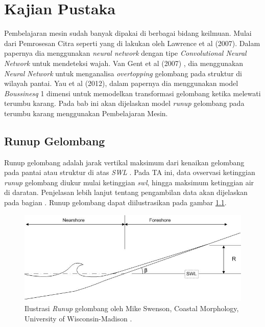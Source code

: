 \chapter{Kajian Pustaka}

    Pembelajaran mesin sudah banyak dipakai di berbagai bidang keilmuan. Mulai dari Pemrosesan Citra seperti yang di lakukan oleh Lawrence et al (2007)\cite{lawrence1997face}. Dalam papernya dia menggunakan \emph{neural network} dengan tipe \emph{Convolutional Neural Network} untuk mendeteksi wajah. Van Gent et al (2007) \cite{van2007neural}, dia menggunakan \emph{Neural Network} untuk menganalisa \emph{overtopping} gelombang pada struktur di wilayah pantai. Yau et al (2012)\cite{YAO201230}, dalam papernya dia menggunakan model \emph{Boussinesq} 1 dimensi untuk memodelkan transformasi gelombang ketika melewati terumbu karang. Pada bab ini akan dijelaskan model \emph{runup} gelombang pada terumbu karang menggunakan Pembelajaran Mesin.

\section{Runup Gelombang}

    Runup gelombang adalah jarak vertikal maksimum dari kenaikan gelombang pada pantai atau struktur di atas \emph{SWL} \cite{sorensen2005basic}. Pada TA ini, data ovservasi ketinggian \emph{runup} gelombang diukur mulai ketinggian \emph{swl}, hingga maksimum ketinggian air di daratan. Penjelasan lebih lanjut tentang pengambilan data akan dijelaskan pada bagian . Runup gelombang dapat diilustrasikan pada gambar \ref{fig:runup}.

    \begin{figure}
        \begin{center}
            \includegraphics[scale=0.7]{./images/runup_gelombang.jpg}
        \end{center}
        \caption{Ilustrasi \emph{Runup} gelombang oleh Mike Swenson, Coastal Morphology, University of Wisconsin-Madison \cite{MikeSwenson:WaveRunup}.}
        \label{fig:runup}
    \end{figure}
    \FloatBarrier

